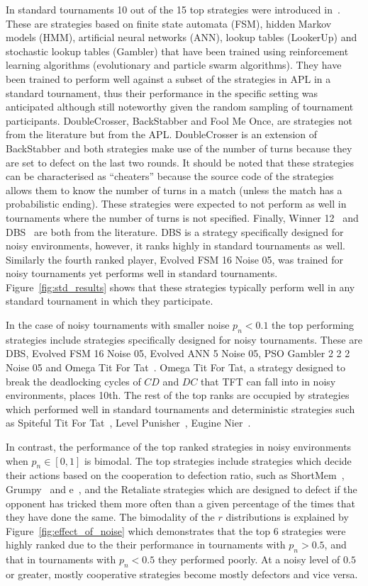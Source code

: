 In standard tournaments 10 out of the 15 top strategies were introduced
in~\cite{Harper2017}. These are strategies based on finite state automata (FSM),
hidden Markov models (HMM), artificial neural networks (ANN), lookup tables
(LookerUp) and stochastic lookup tables (Gambler) that have been trained using
reinforcement learning algorithms (evolutionary and particle swarm algorithms).
They have been trained to perform well against a subset of the strategies
in APL in a standard tournament, thus their performance in the
specific setting was anticipated although still noteworthy given the random
sampling of tournament participants. DoubleCrosser, BackStabber and Fool Me Once, are
strategies not from the literature but from the APL. DoubleCrosser is an extension
of BackStabber and both strategies make use of the number of turns because they are
set to defect on the last two rounds. It should be noted that these
strategies can be characterised as ``cheaters'' because the source code of the strategies
allows them to know the number of turns in a match (unless the match has a probabilistic ending). These strategies were expected to not perform as well in
tournaments where the number of turns is not specified. Finally, Winner
12~\cite{mathieu2017} and DBS~\cite{Au2006} are both from the literature.
DBS is a strategy specifically designed for noisy environments, however, it ranks
highly in standard tournaments as well. Similarly the fourth ranked player,
Evolved FSM 16 Noise 05, was
trained for noisy tournaments yet performs well in standard tournaments.
Figure~\ref{fig:std_results} shows that these strategies typically perform
well in any standard tournament in which they participate.

In the case of noisy tournaments with smaller noise \(p_n < 0.1\) the top
performing strategies
include strategies specifically designed for noisy tournaments. These are DBS,
Evolved FSM 16 Noise 05, Evolved ANN 5 Noise 05, PSO Gambler 2 2 2 Noise 05 and
Omega Tit For Tat~\cite{kendall2007iterated}. Omega Tit For Tat, a strategy designed
to break the deadlocking cycles of \(CD\) and \(DC\) that TFT can fall into in noisy
environments, places 10th. The rest of the top ranks are
occupied by strategies which performed well in standard tournaments and
deterministic strategies such as Spiteful Tit For Tat~\cite{prison}, Level
Punisher~\cite{Eckhart2015}, Eugine Nier~\cite{lesswrong}.

In contrast, the performance of the top ranked strategies in noisy environments
when \(p_n\in [0, 1]\) is bimodal. The top strategies include strategies which
decide their actions based on the cooperation to defection ratio, such as
ShortMem~\cite{Andre2013}, Grumpy~\cite{axelrodproject} and
e~\cite{axelrodproject}, and the Retaliate strategies which are designed to
defect if the opponent has tricked them more often than a given percentage of the times that
they have done the same. The bimodality of the \(r\) distributions is explained
by Figure~\ref{fig:effect_of_noise} which demonstrates that the top 6 strategies
were highly ranked due to the their performance in tournaments with \(p_n>0.5\),
and that in tournaments with \(p_n<0.5\) they
performed poorly. At a noisy level of \(0.5\) or greater, mostly cooperative strategies
become mostly defectors and vice versa.

